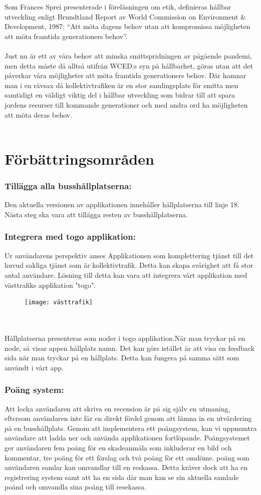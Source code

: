 \documentclass{article}
\begin{document}
Som Frances Sprei presenterade i föreläsningen om etik, definieras hållbar utveckling enligt Brundtland Report av World Commission on Environment \& Development, 1987: “Att möta dagens behov utan att kompromissa möjligheten att möta framtida generationers behov”.  
\\\\
Just nu är ett av våra behov att minska smittspridningen av pågående pandemi, men detta måste då alltså utifrån WCED:s syn på hållbarhet, göras utan att det påverkar våra möjligheter att möta framtida generationers behov. Där hamnar man i en rävsax då kollektivtrafiken är en stor samlingsplats för smitta men samtidigt en väldigt viktig del i hållbar utveckling som bidrar till att spara jordens resurser till kommande generationer och med andra ord ha möjligheten att möta deras behov. 
\\\\
\section*{Förbättringsområden}
\subsubsection*{Tillägga alla busshållplatserna: }
Den aktuella versionen av applikationen innehåller hållplatserna till linje 18. Nästa steg ska vara att tillägga resten av busshållplatserna.
\subsubsection*{Integrera med togo applikation: }
Ur användarens perspektiv anses Applikationen som komplettering tjänst till det huvud sakliga tjänst som är kollektivtrafik. Detta kan skapa svårighet att få stor antal användare. Lösning till detta kan vara att integrera vårt applikation med västtrafiks applikation "togo".
\begin{figure}[htp]
    \centering
    \texttt{[image: västtrafik]}
    \label{fig:Map}
\end{figure}
\\\\
Hållplatserna presenteras som noder i togo applikation.När man tryckar på en node, så visar appen hållplats namn. Det kan görs istället är att visa en feedback sida när man tryckar på en hållplats. Detta kan fungera på samma sätt som användt i vårt app.
\subsubsection*{Poäng system: }
Att locka användaren att skriva en recension är på sig själv en utmaning, eftersom användaren inte får en direkt fördel genom att lämna in en utvärdering på en busshållplats. Genom att implementera ett poängsystem, kan vi uppmuntra användare att ladda ner och använda applikationen fortlöpande. Poängsystemet ger användaren fem poäng för en skadeanmäla som inkluderar en bild och kommentar, tre poäng för ett förslag och två poäng för ett omdöme. poäng som användaren samlar kan omvandlar till en reskassa. Detta kräver dock att ha en registrering system samt att ha en sida där man kan se sin aktuella samlade poänd och omvandla sina poäng till resekassa.
\end{document}
